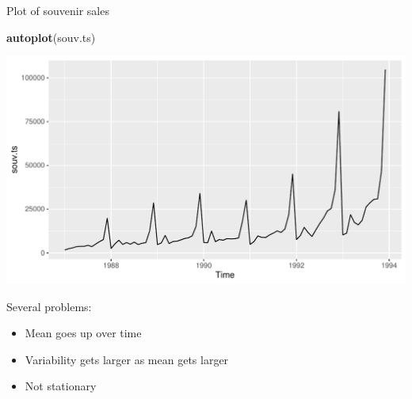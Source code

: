 \documentclass[ignorenonframetext,]{beamer}
\newenvironment{Shaded}{\begin{snugshade}}{\end{snugshade}}
\newcommand{\KeywordTok}[1]{\textcolor[rgb]{0.13,0.29,0.53}{\textbf{#1}}}
\newcommand{\NormalTok}[1]{#1}
\providecommand{\tightlist}{%
  \setlength{\itemsep}{0pt}\setlength{\parskip}{0pt}}
\begin{document}
\begin{frame}[fragile]{Plot of souvenir sales}
\protect\hypertarget{plot-of-souvenir-sales}{}

\begin{Shaded}
\begin{Highlighting}[]
\KeywordTok{autoplot}\NormalTok{(souv.ts)}
\end{Highlighting}
\end{Shaded}

\includegraphics{figure/unnamed-chunk-591-1.pdf}

\end{frame}

\begin{frame}{Several problems:}
\protect\hypertarget{several-problems}{}

\begin{itemize}
\tightlist
\item
  Mean goes up over time
\item
  Variability gets larger as mean gets larger
\item
  Not stationary
\end{itemize}

\end{frame}
\end{document}
